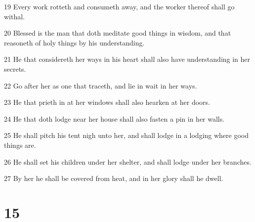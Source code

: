 \par 19 Every work rotteth and consumeth away, and the worker thereof shall go withal.
\par 20 Blessed is the man that doth meditate good things in wisdom, and that reasoneth of holy things by his understanding.
\par 21 He that considereth her ways in his heart shall also have understanding in her secrets.
\par 22 Go after her as one that traceth, and lie in wait in her ways.
\par 23 He that prieth in at her windows shall also hearken at her doors.
\par 24 He that doth lodge near her house shall also fasten a pin in her walls.
\par 25 He shall pitch his tent nigh unto her, and shall lodge in a lodging where good things are.
\par 26 He shall set his children under her shelter, and shall lodge under her branches.
\par 27 By her he shall be covered from heat, and in her glory shall he dwell.

\chapter{15}

